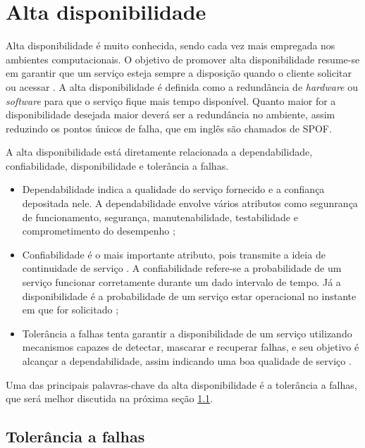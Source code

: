 \chapter{Alta disponibilidade}
\label{cap:altadiponibilidade}

Alta disponibilidade é muito conhecida, sendo cada vez mais empregada nos ambientes computacionais. O objetivo de promover alta disponibilidade 
resume-se em garantir que um serviço esteja sempre a disposição quando o cliente solicitar ou acessar \cite{costa2009}.
A alta disponibilidade é definida como a redundância de \textit{hardware} ou \textit{software} para que o serviço fique mais tempo disponível.
Quanto maior for a disponibilidade desejada maior deverá ser a redundância no ambiente, assim reduzindo os pontos únicos de falha,
que em inglês são chamados de \ac{SPOF}.

A alta disponibilidade está diretamente relacionada a dependabilidade, confiabilidade, disponibilidade e tolerância a falhas. 
\begin{itemize}
 \item Dependabilidade indica a qualidade do serviço fornecido e a confiança depositada nele. A dependabilidade envolve vários
atributos como segunrança de funcionamento, segurança, manutenabilidade, testabilidade e comprometimento do desempenho \cite{weber2002};
 \item Confiabilidade é o mais importante atributo, pois transmite a ideia de continuidade de serviço \cite{pankaj1994}. A confiabilidade refere-se 
a probabilidade de um serviço funcionar corretamente durante um dado intervalo de tempo. Já a disponibilidade é a probabilidade de um 
serviço estar operacional no instante em que for solicitado \cite{costa2009};
  \item Tolerância a falhas tenta garantir a disponibilidade de um serviço utilizando mecanismos capazes de detectar, mascarar e recuperar falhas, 
e seu objetivo é alcançar a dependabilidade, assim indicando uma boa qualidade de serviço \cite{costa2009}.
\end{itemize}

Uma das principais palavras-chave da alta disponibilidade é a tolerância a falhas, que será melhor discutida na próxima seção \ref{section:toleranciafalhas}.

\section{Tolerância a falhas}
\label{section:toleranciafalhas}

